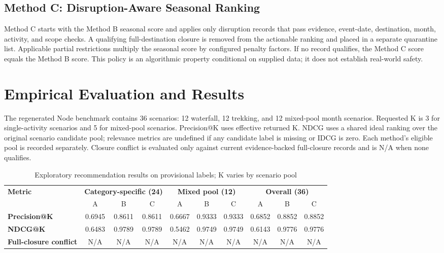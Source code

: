 \documentclass[conference]{IEEEtran}
\begin{document}
\subsection{Method C: Disruption-Aware Seasonal Ranking}
Method C starts with the Method B seasonal score and applies only disruption records that pass evidence, event-date, destination, month, activity, and scope checks. A qualifying full-destination closure is removed from the actionable ranking and placed in a separate quarantine list. Applicable partial restrictions multiply the seasonal score by configured penalty factors. If no record qualifies, the Method C score equals the Method B score. This policy is an algorithmic property conditional on supplied data; it does not establish real-world safety.
\section{Empirical Evaluation and Results}
The regenerated Node benchmark contains 36 scenarios: 12 waterfall, 12 trekking, and 12 mixed-pool month scenarios. Requested K is 3 for single-activity scenarios and 5 for mixed-pool scenarios. Precision@K uses effective returned K. NDCG uses a shared ideal ranking over the original scenario candidate pool; relevance metrics are undefined if any candidate label is missing or IDCG is zero. Each method's eligible pool is recorded separately. Closure conflict is evaluated only against current evidence-backed full-closure records and is N/A when none qualifies.

\begin{table}[t]
\centering
\caption{Exploratory recommendation results on provisional labels; K varies by scenario pool}
\label{tab:recsys_results}
\begin{tabular}{l|ccc|ccc|ccc}
\hline
\textbf{Metric} & \multicolumn{3}{c|}{\textbf{Category-specific (24)}} & \multicolumn{3}{c|}{\textbf{Mixed pool (12)}} & \multicolumn{3}{c}{\textbf{Overall (36)}} \\
& A & B & C & A & B & C & A & B & C \\
\hline
\textbf{Precision@K} & 0.6945 & 0.8611 & 0.8611 & 0.6667 & 0.9333 & 0.9333 & 0.6852 & 0.8852 & 0.8852 \\
\textbf{NDCG@K} & 0.6483 & 0.9789 & 0.9789 & 0.5462 & 0.9749 & 0.9749 & 0.6143 & 0.9776 & 0.9776 \\
\textbf{Full-closure conflict} & N/A & N/A & N/A & N/A & N/A & N/A & N/A & N/A & N/A \\
\hline
\end{tabular}
\end{table}
\end{document}
